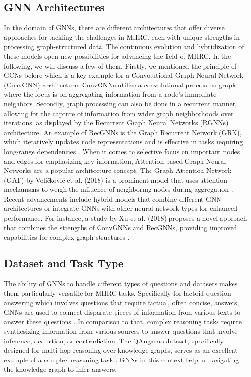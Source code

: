\documentclass[sigplan,screen]{acmart}
\begin{document}
\subsection{GNN Architectures}
In the domain of GNNs, there are different architectures that offer diverse approaches for tackling the challenges in MHRC, each with unique strengths
in processing graph-structured data. The continuous evolution and hybridization of these models open new possibilities for advancing the field of MHRC. In
the following, we will discuss a few of them. Firstly, we mentioned the principle of GCNs before which is a key example for a Convolutional Graph 
Neural Network (ConvGNN) architecture. ConvGNNs utilize a convolutional process on graphs where the focus is on aggregating information from a node's 
immediate neighbors. Secondly, graph processing can also be done in a recurrent manner, allowing for the capture of information from wider graph 
neighborhoods over iterations, as displayed by the Recurrent Graph Neural Networks (RGNNs) architecture. An example of RecGNNs is the Graph Recurrent
Network (GRN), which iteratively updates node representations and is effective in tasks requiring long-range dependencies \cite{RN211}. When it comes to
selective focus on important nodes and edges for emphasizing key information, Attention-based Graph Neural Networks are a popular architecture concept. 
The Graph Attention Network (GAT) by Veličković et al. (2018) is a prominent model that uses attention mechanisms to weigh the influence of neighboring
nodes during aggregation \cite{RN7}. Recent advancements include hybrid models that combine different GNN architectures or integrate GNNs with other neural
network types for enhanced performance. For instance, a study by Xu et al. (2018) proposes a novel approach that combines the strengths of ConvGNNs 
and RecGNNs, providing improved capabilities for complex graph structures \cite{RN15}.

\subsection{Dataset and Task Type}
The ability of GNNs to handle different types of questions and datasets makes them particularly versatile for MHRC tasks. Specifically for factoid question
answering which involves questions that require factual, often concise, answers, GNNs are used to connect disparate pieces of information from various texts
to answer these questions \cite{RN116}. In comparison to that, complex reasoning tasks require synthesizing information from various sources to answer 
questions that involve inference, deduction, or contradiction. The QAngaroo dataset, specifically designed for multi-hop reasoning over knowledge graphs, 
serves as an excellent example of a complex reasoning task \cite{RN212}. GNNs in this context help in navigating the knowledge graph to infer answers.
\end{document}
